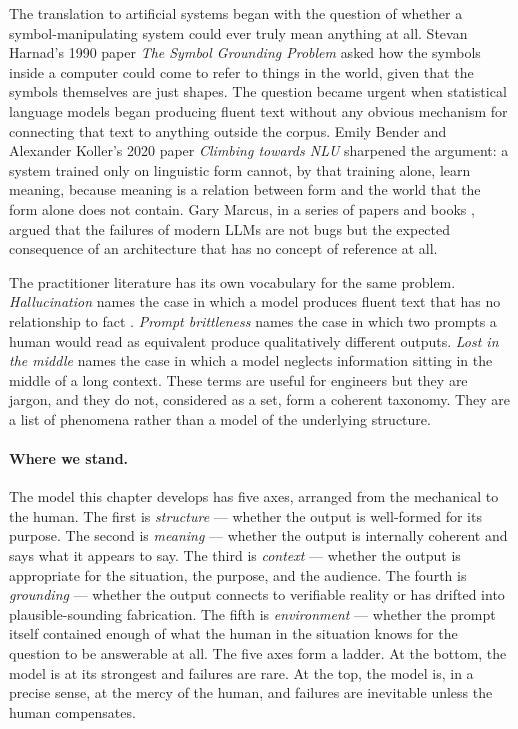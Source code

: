 The translation to artificial systems began with the question of
whether a symbol-manipulating system could ever truly mean anything
at all. Stevan Harnad's 1990 paper \emph{The Symbol Grounding
Problem} \citep{harnad1990symbol} asked how the symbols inside a
computer could come to refer to things in the world, given that the
symbols themselves are just shapes. The question became urgent when
statistical language models began producing fluent text without any
obvious mechanism for connecting that text to anything outside the
corpus. Emily Bender and Alexander Koller's 2020 paper
\emph{Climbing towards NLU} \citep{bender2020climbing} sharpened the
argument: a system trained only on linguistic form cannot, by that
training alone, learn meaning, because meaning is a relation
between form and the world that the form alone does not contain.
Gary Marcus, in a series of papers and books
\citep{marcus2020next}, argued that the failures of modern LLMs are
not bugs but the expected consequence of an architecture that has
no concept of reference at all.

The practitioner literature has its own vocabulary for the same
problem. \emph{Hallucination} names the case in which a model
produces fluent text that has no relationship to fact
\citep{ji2023survey}. \emph{Prompt brittleness} names the case in
which two prompts a human would read as equivalent produce
qualitatively different outputs. \emph{Lost in the middle} names
the case in which a model neglects information sitting in the
middle of a long context. These terms are useful for engineers but
they are jargon, and they do not, considered as a set, form a
coherent taxonomy. They are a list of phenomena rather than a model
of the underlying structure.

\paragraph{Where we stand.}
The model this chapter develops has five axes, arranged from the
mechanical to the human. The first is \emph{structure} --- whether
the output is well-formed for its purpose. The second is
\emph{meaning} --- whether the output is internally coherent and
says what it appears to say. The third is \emph{context} ---
whether the output is appropriate for the situation, the purpose,
and the audience. The fourth is \emph{grounding} --- whether the
output connects to verifiable reality or has drifted into
plausible-sounding fabrication. The fifth is \emph{environment} ---
whether the prompt itself contained enough of what the human in the
situation knows for the question to be answerable at all. The five
axes form a ladder. At the bottom, the model is at its strongest
and failures are rare. At the top, the model is, in a precise
sense, at the mercy of the human, and failures are inevitable
unless the human compensates.

